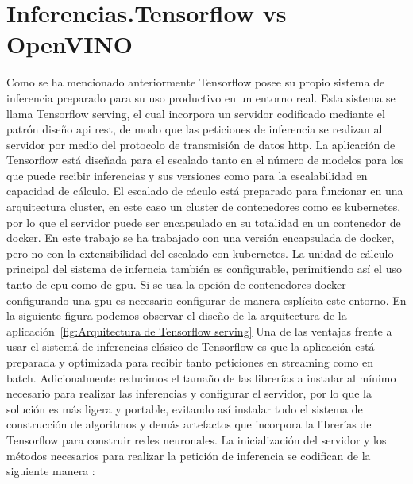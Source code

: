 \section{Inferencias.Tensorflow vs OpenVINO}\label{sec:inferencias.-Tensorflow-vs-OpenVINO}
Como se ha mencionado anteriormente Tensorflow posee su propio sistema de inferencia preparado para su uso productivo en un entorno real.
Esta sistema se llama Tensorflow serving, el cual incorpora un servidor codificado mediante el patrón diseño api rest, de modo que las peticiones
de inferencia se realizan al servidor por medio del protocolo de transmisión de datos http.
La aplicación de Tensorflow está diseñada para el escalado tanto en el número de modelos para los que puede recibir inferencias y sus versiones como para la escalabilidad en capacidad de cálculo.
El escalado de cáculo está preparado para funcionar en una arquitectura cluster, en este caso un cluster de contenedores como es kubernetes, por lo que el servidor puede ser
encapsulado en su totalidad en un contenedor de docker.
En este trabajo se ha trabajado con una versión encapsulada de docker, pero no con la extensibilidad del escalado con kubernetes.
La unidad de cálculo principal del sistema de inferncia también es configurable, perimitiendo así el uso tanto de cpu como de gpu.
Si se usa la opción de contenedores docker configurando una gpu es necesario configurar de manera esplícita este entorno.
En la siguiente figura podemos observar el diseño de la arquitectura de la aplicación~\ref{fig:Arquitectura de Tensorflow serving}
Una de las ventajas frente a usar el sistemá de inferencias clásico de Tensorflow es que la aplicación está preparada y optimizada para recibir tanto peticiones en streaming como en batch.
Adicionalmente reducimos el tamaño de las librerías a instalar al mínimo necesario para realizar las inferencias y configurar el servidor, por lo que la solución es más ligera y portable, evitando así
instalar todo el sistema de construcción de algoritmos y demás artefactos que incorpora la librerías de Tensorflow para construir redes neuronales.
La inicialización del servidor y los métodos necesarios para realizar la petición de inferencia se codifican de la siguiente manera :


